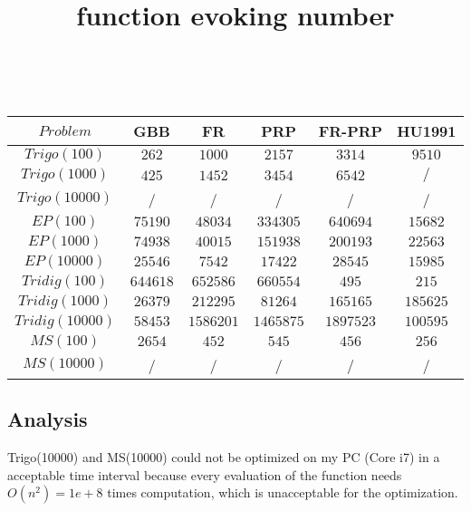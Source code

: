 \documentclass{article}
\begin{document}
\begin{table}[h!]
\title{ function evoking number }
\\
	\centering
	\begin{tabular}{|c||c|c|c|c|c|}
		\hline
		 $Problem$ & GBB & FR & PRP & FR-PRP & HU1991 \\ \hline
		  
		 $Trigo(100)$ & $262$ & $1000$ & $2157$ & $3314$ & $9510$ \\ \hline
		 
		 $Trigo(1000)$ & $425$ & $1452$ & $3454$ & $6542$ & $/$ \\ \hline
		 
		 $Trigo(10000)$ & / & / & / & / & / \\ \hline
		 
		 $EP(100)$ & $75190$ & $48034$ & $334305$ & $640694$ & $15682$ \\ \hline
		 
		 $EP(1000)$ & $74938$ & $40015$ & $151938$ & $200193$ & $22563$ \\ \hline
		  
		 $EP(10000)$ & $25546$ & $7542$ & $17422$ & $28545$ & $15985$ \\ \hline
		 
		 $Tridig(100)$ & $644618$ & $652586$ & $660554$ & $495$ & $215$ \\ \hline
		 
		 $Tridig(1000)$ & $26379$ & $212295$ & $81264$ & $165165$ & $185625$ \\ \hline
		 
		 $Tridig(10000)$ & $58453$ & $1586201$ & $1465875$ & $1897523$ & $100595$ \\ \hline
		 
		 $MS(100)$ & $2654$ & $452$ & $545$ & $456$ & $256$ \\ \hline
		 
		 $MS(10000)$ & / & / & / & / & / \\ \hline
		  
		
	\end{tabular}

\end{table}
		 
\subsection{Analysis}

Trigo(10000) and MS(10000) could not be optimized on my PC (Core i7) in a acceptable time interval because every evaluation of the function needs $O(n^2) = 1e+8$ times computation, which is unacceptable for the optimization.
\end{document}
